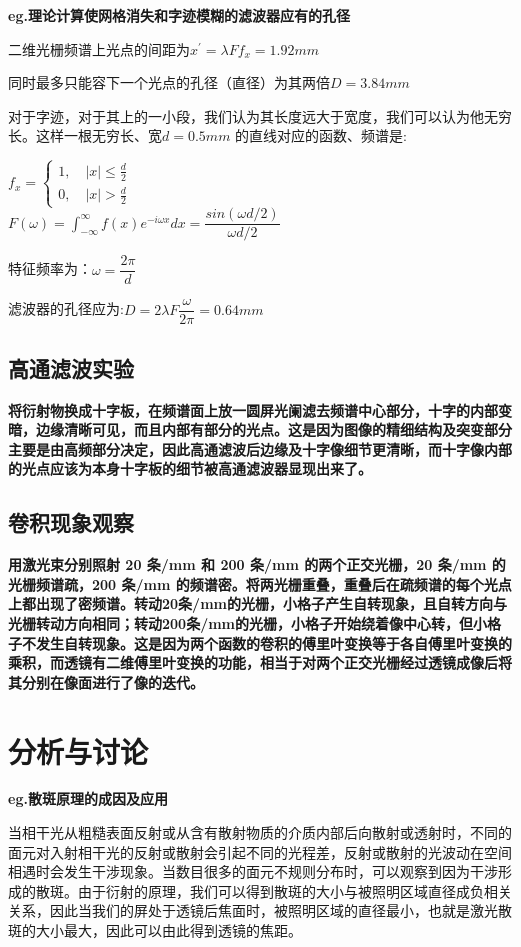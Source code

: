 \documentclass[UTF8]{ctexart}
\begin{document}
\noindent
\textbf{eg.理论计算使网格消失和字迹模糊的滤波器应有的孔径}
\par 二维光栅频谱上光点的间距为$x^{\prime}=\lambda Ff_{x}=1.92mm$
\par 同时最多只能容下一个光点的孔径（直径）为其两倍$D=3.84mm$
\par 对于字迹，对于其上的一小段，我们认为其长度远大于宽度，我们可以认为他无穷长。这样一根无穷长、宽$ d = 0.5mm$ 的直线对应的函数、频谱是:
\begin{center}
	$f_{x}=\left\{
	\begin{array}{lr}
		 1,\quad |x|\leq\frac{d}{2}\\
		 0,\quad|x|>\frac{d}{2}
	\end{array}
	\right.$\\
	$F(\omega)=\int_{-\infty}^{\infty}f(x)e^{-i\omega x}dx=\dfrac{sin(\omega d/2)}{\omega d/2}$
\end{center}
\par 特征频率为：$\omega=\dfrac{2\pi}{d}$
\par 滤波器的孔径应为:$D=2\lambda F\dfrac{\omega}{2\pi}=0.64mm$
\subsection{高通滤波实验}
\textbf{将衍射物换成十字板，在频谱面上放一圆屏光阑滤去频谱中心部分，十字的内部变暗，边缘清晰可见，而且内部有部分的光点。这是因为图像的精细结构及突变部分主要是由高频部分决定，因此高通滤波后边缘及十字像细节更清晰，而十字像内部的光点应该为本身十字板的细节被高通滤波器显现出来了。}
\subsection{卷积现象观察}
\textbf{用激光束分别照射 20 条/mm 和 200 条/mm 的两个正交光栅，20 条/mm 的光栅频谱疏，200 条/mm 的频谱密。将两光栅重叠，重叠后在疏频谱的每个光点上都出现了密频谱。转动20条/mm的光栅，小格子产生自转现象，且自转方向与光栅转动方向相同；转动200条/mm的光栅，小格子开始绕着像中心转，但小格子不发生自转现象。这是因为两个函数的卷积的傅里叶变换等于各自傅里叶变换的乘积，而透镜有二维傅里叶变换的功能，相当于对两个正交光栅经过透镜成像后将其分别在像面进行了像的迭代。}
	\section{分析与讨论}
	\noindent
	\textbf{eg.散斑原理的成因及应用}
	\par 当相干光从粗糙表面反射或从含有散射物质的介质内部后向散射或透射时，不同的面元对入射相干光的反射或散射会引起不同的光程差，反射或散射的光波动在空间相遇时会发生干涉现象。当数目很多的面元不规则分布时，可以观察到因为干涉形成的散斑。由于衍射的原理，我们可以得到散斑的大小与被照明区域直径成负相关关系，因此当我们的屏处于透镜后焦面时，被照明区域的直径最小，也就是激光散斑的大小最大，因此可以由此得到透镜的焦距。
\end{document}
